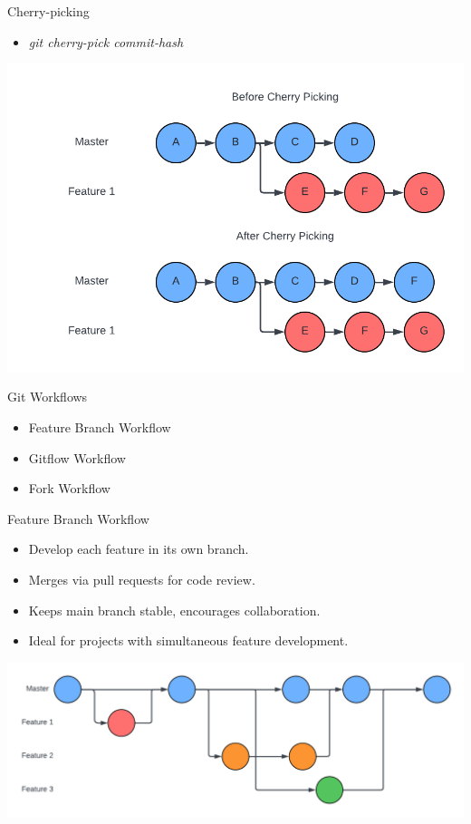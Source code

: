 \documentclass[aspectratio=169]{beamer}
\begin{document}
\begin{frame}{Cherry-picking}
    \begin{itemize}
        \item \textit{git cherry-pick commit-hash}
    \end{itemize}
    \begin{center}
        \includegraphics[scale=.25]{cherry_diagram.png}
    \end{center}
\end{frame}
\begin{frame}{Git Workflows}
    \begin{itemize}
        \item Feature Branch Workflow
        \item Gitflow Workflow
        \item Fork Workflow
    \end{itemize}
\end{frame}
\begin{frame}{Feature Branch Workflow}
    \begin{itemize}
        \item Develop each feature in its own branch.
        \item Merges via pull requests for code review.
        \item Keeps main branch stable, encourages collaboration.
        \item Ideal for projects with simultaneous feature development.
    \end{itemize}
    \begin{center}
        \includegraphics[scale=.25]{feature_workflow_diagram.png}
    \end{center}
\end{frame}
\end{document}
